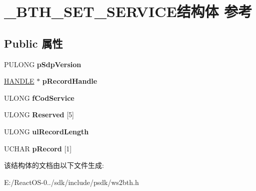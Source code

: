 \hypertarget{struct___b_t_h___s_e_t___s_e_r_v_i_c_e}{}\section{\+\_\+\+B\+T\+H\+\_\+\+S\+E\+T\+\_\+\+S\+E\+R\+V\+I\+C\+E结构体 参考}
\label{struct___b_t_h___s_e_t___s_e_r_v_i_c_e}
\subsection*{Public 属性}
\begin{DoxyCompactItemize}
\item 
\mbox{\label{struct___b_t_h___s_e_t___s_e_r_v_i_c_e_a31f96f227165ce5560c326f99df61a72}} 
P\+U\+L\+O\+NG {\bfseries p\+Sdp\+Version}
\item 
\mbox{\label{struct___b_t_h___s_e_t___s_e_r_v_i_c_e_a33e2a2eb428fcc9b86d574359925538b}} 
\hyperlink{interfacevoid}{H\+A\+N\+D\+LE} $\ast$ {\bfseries p\+Record\+Handle}
\item 
\mbox{\label{struct___b_t_h___s_e_t___s_e_r_v_i_c_e_a95599bd4c4e1ee38985496bcf5ed2dbc}} 
U\+L\+O\+NG {\bfseries f\+Cod\+Service}
\item 
\mbox{\label{struct___b_t_h___s_e_t___s_e_r_v_i_c_e_afc561f01d2e3464cc4982bf87b1516ef}} 
U\+L\+O\+NG {\bfseries Reserved} \mbox{[}5\mbox{]}
\item 
\mbox{\label{struct___b_t_h___s_e_t___s_e_r_v_i_c_e_ac6155ea6d6fca96fd773451aa8f1a185}} 
U\+L\+O\+NG {\bfseries ul\+Record\+Length}
\item 
\mbox{\label{struct___b_t_h___s_e_t___s_e_r_v_i_c_e_ab82c771b41955e25a4840cff2383ca39}} 
U\+C\+H\+AR {\bfseries p\+Record} \mbox{[}1\mbox{]}
\end{DoxyCompactItemize}


该结构体的文档由以下文件生成\+:\begin{DoxyCompactItemize}
\item 
E\+:/\+React\+O\+S-\/0../sdk/include/psdk/ws2bth.\+h\end{DoxyCompactItemize}
